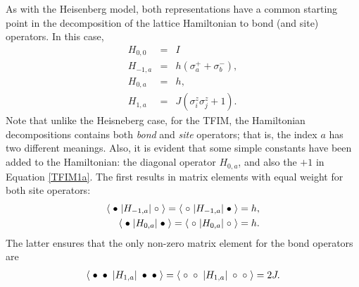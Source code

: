 \documentclass[vecphys]{svmult}
\begin{document}
As with the Heisenberg model, both representations have a common starting point in the decomposition of the lattice Hamiltonian to bond (and site) operators.  In this case, 
\begin{eqnarray}
H_{0,0} &=& I \label {TFIM00} \\
H_{-1,a} &=& h(\sigma^+_a + \sigma^-_b), \label{TFIM-1a} \\
H_{0,a} &=& h, \\
H_{1,a} &=& J (\sigma^z_i \sigma^z_j + 1).  \label{TFIM1a}
\end{eqnarray}
Note that unlike the Heisneberg case, for the TFIM, the Hamiltonian decompositions contains both {\it bond} and {\it site} operators; that is, the index $a$ has two different meanings.  Also, it is evident that some simple constants have been added to the Hamiltonian:  the diagonal operator $H_{0,a}$, and also the $+1$ in Equation \ref{TFIM1a}.  The first results in matrix elements with equal weight for both site operators:
\begin{eqnarray}
\langle \hspace{1mm} \bullet \hspace{1mm}  | H_{-1,a} |\hspace{1mm} \circ \hspace{1mm} \rangle = 
\langle \hspace{1mm} \circ \hspace{1mm}  | H_{-1,a} |\hspace{1mm} \bullet \hspace{1mm} \rangle = h, \label {Tw1} \\
\langle \hspace{1mm}  \bullet \hspace{1mm}  | H_{0,a} | \hspace{1mm} \bullet \hspace{1mm} \rangle = 
\langle \hspace{1mm}  \circ \hspace{1mm}  | H_{0,a} | \hspace{1mm} \circ \hspace{1mm} \rangle = h. \label{Tw2}
\end{eqnarray} 
The latter ensures that the only non-zero matrix element for the bond operators are
\begin{eqnarray}
\langle \hspace{1mm} \bullet \hspace{1mm}  \bullet \hspace{1mm}  | H_{1,a} | \hspace{1mm} \bullet \hspace{1mm} \bullet \hspace{1mm} \rangle = 
\langle \hspace{1mm} \circ \hspace{1mm}  \circ \hspace{1mm}  | H_{1,a} | \hspace{1mm} \circ \hspace{1mm} \circ \hspace{1mm} \rangle = 2J. \label {Tfimdiag} 
\end{eqnarray}
\end{document}
